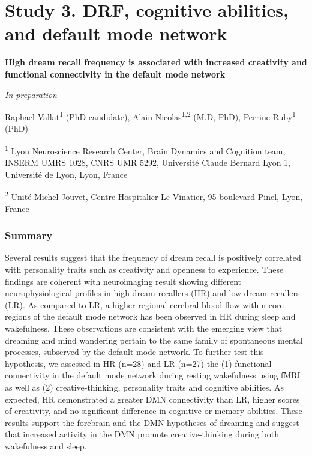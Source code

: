 \cleardoublepage

\chapter{Study 3. DRF, cognitive abilities, and default mode network}
\label{res:dmn-crea}

\cleardoublepage

\textbf{{\large High dream recall frequency is associated with increased creativity and functional connectivity in the default mode network}}

\hfill \emph{In preparation}

\bigskip

Raphael Vallat\textsuperscript{1} (PhD candidate), Alain Nicolas\textsuperscript{1,2} (M.D, PhD), Perrine Ruby\textsuperscript{1} (PhD)

\textsuperscript{1} Lyon Neuroscience Research Center, Brain Dynamics and Cognition team, INSERM UMRS 1028, CNRS UMR 5292, Université Claude Bernard Lyon 1, Université de Lyon, Lyon, France

\textsuperscript{2} Unité Michel Jouvet, Centre Hospitalier Le Vinatier, 95 boulevard Pinel, Lyon, France

\subsection*{Summary}
\label{res:dmn-crea:summary}
Several results suggest that the frequency of dream recall is positively correlated with personality traits such as creativity and openness to experience. These findings are coherent with neuroimaging result showing different neurophysiological profiles in high dream recallers (HR) and low dream recallers (LR).  As compared to LR, a higher regional cerebral blood flow within core regions of the default mode network has been observed in HR during sleep and wakefulness. These observations are consistent with the emerging view that dreaming and mind wandering pertain to the same family of spontaneous mental processes, subserved by the default mode network. To further test this hypothesis, we assessed in HR (n=28) and LR (n=27) the (1) functional connectivity in the default mode network during resting wakefulness using fMRI as well as (2) creative-thinking, personality traits and cognitive abilities. As expected, HR demonstrated a greater DMN connectivity than LR, higher scores of creativity, and no significant difference in cognitive or memory abilities. These results support the forebrain and the DMN hypotheses of dreaming and suggest that increased activity in the DMN promote creative-thinking during both wakefulness and sleep.

